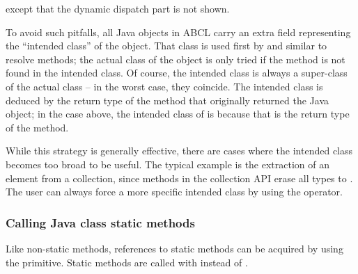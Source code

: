 \documentclass[10pt]{book}
\begin{document}
except that the dynamic dispatch part is not shown.

To avoid such pitfalls, all Java objects in \textsc{ABCL} carry an extra
field representing the ``intended class'' of the object. That class is
used first by  and similar to resolve methods; the
actual class of the object is only tried if the method is not found in
the intended class. Of course, the intended class is always a
super-class of the actual class -- in the worst case, they coincide. The
intended class is deduced by the return type of the method that
originally returned the Java object; in the case above, the intended
class of  is  because that is the
return type of the  method.

While this strategy is generally effective, there are cases where the
intended class becomes too broad to be useful. The typical example
is the extraction of an element from a collection, since methods in
the collection API erase all types to . The user can
always force a more specific intended class by using the 
operator.


\subsubsection{Calling Java class static methods}

Like non-static methods, references to static methods can be acquired by
using the  primitive. Static methods are called with
 instead of .
\end{document}
